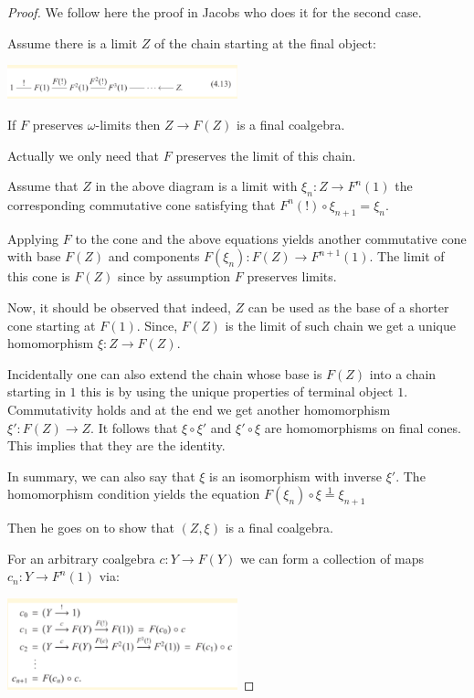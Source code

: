 \begin{proof}
	We follow here the proof in Jacobs \cite{jacobs2005introduction} who does it for the second case.
	
	Assume there is a limit $Z$ of the chain starting at the final object:
	
	\includegraphics[width=0.5\textwidth]{img/chain}
	
	If $F$ preserves $\omega$-limits then $Z \to F(Z)$ is a final coalgebra.
	
	Actually we only need that $F$ preserves the limit of this chain. 
	
	Assume that $Z$ in the above diagram is a limit with $\xi_n:Z \to F^n(1)$ the corresponding commutative cone satisfying that $F^n(!) \circ \xi_{n+1} = \xi_n$. 
	
	Applying $F$ to the cone and the above equations yields another commutative cone with base $F(Z)$  and components $F(\xi_n):F(Z) \to F^{n+1}(1)$. The limit of this cone is $F(Z)$ since by assumption $F$ preserves limits.
	
	Now, it should be observed that indeed, $Z$ can be used as the base of a shorter cone starting at $F(1)$. Since, $F(Z)$ is the limit of such chain we get a unique homomorphism $\xi: Z \to F(Z)$. 
	
	Incidentally one can also extend the chain whose base is $F(Z)$ into a chain starting in $1$ this is by using the unique properties of terminal object $1$. Commutativity holds and at the end we get another homomorphism $\xi': F(Z) \to Z$. It follows that $\xi \circ \xi'$ and $\xi' \circ \xi$ are homomorphisms on final cones. This implies that they are the identity.
	
	In summary, we can also say that $\xi$ is an isomorphism with inverse $\xi'$. The homomorphism condition yields the equation $F(\xi_n) \circ \xi \stackrel{1}{=} \xi_{n+1}$
	
	Then he goes on to show that $(Z,\xi)$ is a final coalgebra. 
	
	For an arbitrary coalgebra $c:Y \to F(Y)$ we can form a collection of maps $c_n: Y \to F^n(1)$ via:
	
	\includegraphics[width=0.5\textwidth]{img/mappings}
	

\end{proof}
